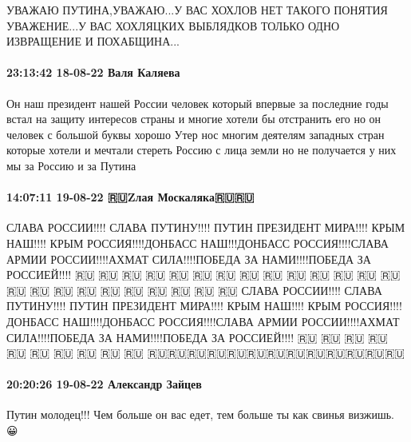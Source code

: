 УВАЖАЮ ПУТИНА,УВАЖАЮ...У ВАС ХОХЛОВ НЕТ ТАКОГО ПОНЯТИЯ УВАЖЕНИЕ...У ВАС
ХОХЛЯЦКИХ ВЫБЛЯДКОВ ТОЛЬКО ОДНО ИЗВРАЩЕНИЕ И ПОХАБЩИНА...

\paragraph{23:13:42 18-08-22 Валя Каляева}

Он наш президент нашей России человек который впервые за последние годы встал
на защиту интересов страны и многие хотели бы отстранить его но он человек с
большой буквы хорошо Утер нос многим деятелям западных стран которые хотели и
мечтали стереть Россию с лица земли но не получается у них мы за Россию и за
Путина

\paragraph{14:07:11 19-08-22 🇷🇺Zлая Москаляка🇷🇺🇷🇺}

СЛАВА РОССИИ!!!! СЛАВА ПУТИНУ!!!! ПУТИН ПРЕЗИДЕНТ МИРА!!!! КРЫМ НАШ!!!! КРЫМ
РОССИЯ!!!!ДОНБАСС НАШ!!!ДОНБАСС РОССИЯ!!!!СЛАВА АРМИИ РОССИИ!!!!АХМАТ
СИЛА!!!!ПОБЕДА ЗА НАМИ!!!!ПОБЕДА ЗА РОССИЕЙ!!!!  🇷🇺 🇷🇺 🇷🇺 🇷🇺 🇷🇺 🇷🇺
🇷🇺 🇷🇺 🇷🇺 🇷🇺 🇷🇺 🇷🇺 🇷🇺 🇷🇺 🇷🇺 🇷🇺 🇷🇺 🇷🇺 🇷🇺 🇷🇺 🇷🇺 🇷🇺
🇷🇺 🇷🇺 СЛАВА РОССИИ!!!! СЛАВА ПУТИНУ!!!! ПУТИН ПРЕЗИДЕНТ МИРА!!!! КРЫМ
НАШ!!!! КРЫМ РОССИЯ!!!! ДОНБАСС НАШ!!!!ДОНБАСС РОССИЯ!!!!СЛАВА АРМИИ
РОССИИ!!!!АХМАТ СИЛА!!!!ПОБЕДА ЗА НАМИ!!!!ПОБЕДА ЗА РОССИЕЙ!!!!  🇷🇺 🇷🇺 🇷🇺
🇷🇺 🇷🇺 🇷🇺 🇷🇺 🇷🇺 🇷🇺 🇷🇺
🇷🇺🇷🇺🇷🇺🇷🇺🇷🇺🇷🇺🇷🇺🇷🇺🇷🇺🇷🇺🇷🇺🇷🇺🇷🇺

\paragraph{20:20:26 19-08-22 Александр Зайцев}

Путин молодец!!! Чем больше он вас едет, тем больше ты как свинья визжишь. 😀


